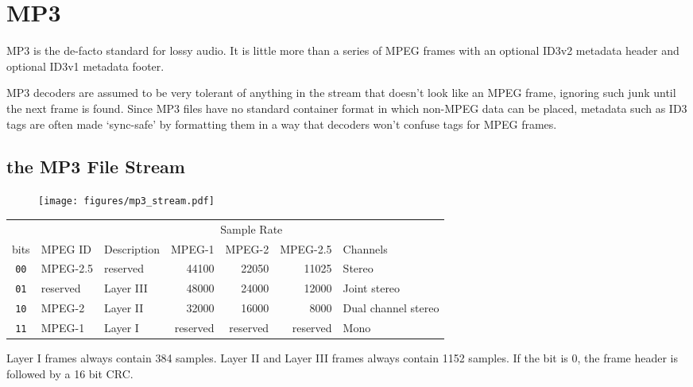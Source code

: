 
\chapter{MP3}
MP3 is the de-facto standard for lossy audio.
It is little more than a series of MPEG frames with an
optional ID3v2 metadata header and optional ID3v1 metadata
footer.

MP3 decoders are assumed to be very tolerant of anything in
the stream that doesn't look like an MPEG frame, ignoring such
junk until the next frame is found.
Since MP3 files have no standard container format in which
non-MPEG data can be placed, metadata such as ID3 tags are often
made `sync-safe' by formatting them in a way that decoders won't
confuse tags for MPEG frames.
\section{the MP3 File Stream}
\begin{figure}[h]
\texttt{[image: figures/mp3\_stream.pdf]}
\end{figure}
\begin{table}[h]
\begin{tabular}{|c||l||l||r|r|r||l|}
\hline
& & & \multicolumn{3}{c||}{Sample Rate} & \\
bits & MPEG ID & Description & MPEG-1 & MPEG-2 & MPEG-2.5 & Channels \\
\hline
\texttt{00} & MPEG-2.5 & reserved & 44100 & 22050 & 11025 & Stereo \\
\texttt{01} & reserved & Layer III & 48000 & 24000 & 12000 & Joint stereo \\
\texttt{10} & MPEG-2 & Layer II & 32000 & 16000 & 8000 & Dual channel stereo\\
\texttt{11} & MPEG-1 & Layer I & reserved & reserved & reserved & Mono \\
\hline
\end{tabular}
\end{table}
\par
\noindent
Layer I frames always contain 384 samples.
Layer II and Layer III frames always contain 1152 samples.
If the  bit is 0, the frame header is followed by a
16 bit CRC.

